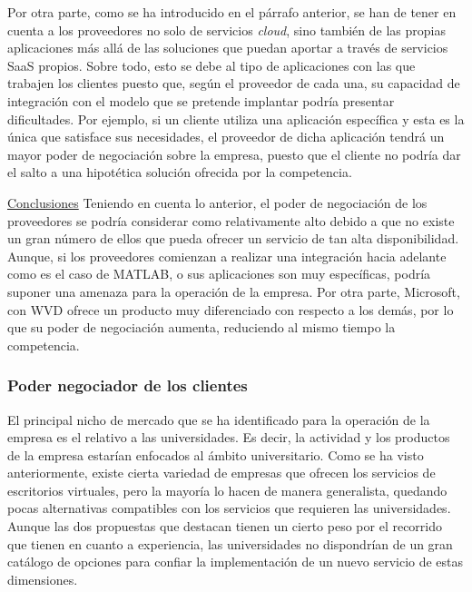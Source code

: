 Por otra parte, como se ha introducido en el párrafo anterior, se han de tener en cuenta a los proveedores no solo de servicios \textit{cloud}, sino también de las propias aplicaciones más allá de las soluciones que puedan aportar a través de servicios \acs{SaaS} propios. Sobre todo, esto se debe al tipo de aplicaciones con las que trabajen los clientes puesto que, según el proveedor de cada una, su capacidad de integración con el modelo que se pretende implantar podría presentar dificultades. Por ejemplo, si un cliente utiliza una aplicación específica y esta es la única que satisface sus necesidades, el proveedor de dicha aplicación tendrá un mayor poder de negociación sobre la empresa, puesto que el cliente no podría dar el salto a una hipotética solución ofrecida por la competencia.

\clearpage

\noindent\underline{Conclusiones}\newline
\indent Teniendo en cuenta lo anterior, el poder de negociación de los proveedores se podría considerar como relativamente alto debido a que no existe un gran número de ellos que pueda ofrecer un servicio de tan alta disponibilidad. Aunque, si los proveedores comienzan a realizar una integración hacia adelante como es el caso de MATLAB, o sus aplicaciones son muy específicas, podría suponer una amenaza para la operación de la empresa. Por otra parte, Microsoft, con \acs{WVD} ofrece un producto muy diferenciado con respecto a los demás, por lo que su poder de negociación aumenta, reduciendo al mismo tiempo la competencia.


\subsubsection{Poder negociador de los clientes}
El principal nicho de mercado que se ha identificado para la operación de la empresa es el relativo a las universidades. Es decir, la actividad y los productos de la empresa estarían enfocados al ámbito universitario. Como se ha visto anteriormente, existe cierta variedad de empresas que ofrecen los servicios de escritorios virtuales, pero la mayoría lo hacen de manera generalista, quedando pocas alternativas compatibles con los servicios que requieren las universidades. Aunque las dos propuestas que destacan tienen un cierto peso por el recorrido que tienen en cuanto a experiencia, las universidades no dispondrían de un gran catálogo de opciones para confiar la implementación de un nuevo servicio de estas dimensiones.

